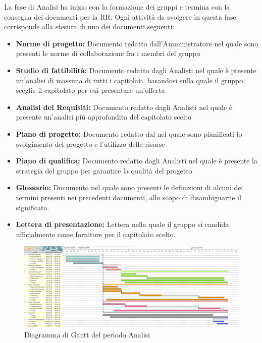 La fase di Analisi ha inizio con la formazione dei gruppi e termina con la consegna dei documenti per la RR. \newline
Ogni attività da svolgere in questa fase corrisponde alla stesura di uno dei documenti seguenti: 
\begin{itemize}
	\item \textbf{Norme di progetto: }
	Documento redatto dall'Amministratore nel quale sono presenti le norme di 					collaborazione fra i membri del gruppo \gruppo
	\item \textbf{Studio di fattibilità: }
	Documento redatto dagli Analisti nel quale è presente un'analisi di massima di tutti 	i capitolati, basandosi sulla quale il gruppo sceglie il capitolato per cui presentare un'offerta
	\item \textbf{Analisi dei Requisiti: }
	Documento redatto dagli Analisti nel quale è presente un'analisi più approfondita del capitolato scelto
	\item \textbf{Piano di progetto: }
	Documento redatto dal \Res nel quale sono pianificati lo svolgimento del progetto e l'utilizzo delle risorse
	\item \textbf{Piano di qualifica: }
	Documento redatto dagli Analisti nel quale è presente la strategia del gruppo \gruppo \space per garantire la qualità del progetto
	\item \textbf{Glossario: }
	Documento nel quale sono presenti le definizioni di alcuni dei termini presenti nei precedenti documenti, allo scopo di disambiguarne il significato.
	\item \textbf{Lettera di presentazione: }
	Lettera nella quale il gruppo \gruppo \space si candida ufficialmente come fornitore per il capitolato scelto.
\end{itemize}

\begin{figure}[ht]
	\includegraphics[width=1\linewidth]{Pianificazione/Analisi_Gantt.png}
	\caption{Diagramma di Gantt del periodo Analisi}
\end{figure}
